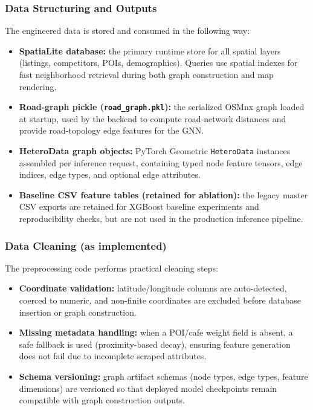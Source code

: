 \subsubsection{Data Structuring and Outputs}
The engineered data is stored and consumed in the following way:

\begin{itemize}
    \item \textbf{SpatiaLite database:} the primary runtime store for all spatial layers (listings, competitors, POIs, demographics). Queries use spatial indexes for fast neighborhood retrieval during both graph construction and map rendering.
    \item \textbf{Road-graph pickle (\texttt{road\_graph.pkl}):} the serialized OSMnx graph loaded at startup, used by the backend to compute road-network distances and provide road-topology edge features for the GNN.
    \item \textbf{HeteroData graph objects:} PyTorch Geometric \texttt{HeteroData} instances assembled per inference request, containing typed node feature tensors, edge indices, edge types, and optional edge attributes.
    \item \textbf{Baseline CSV feature tables (retained for ablation):} the legacy master CSV exports are retained for XGBoost baseline experiments and reproducibility checks, but are not used in the production inference pipeline.
\end{itemize}

\subsubsection{Data Cleaning (as implemented)}
The preprocessing code performs practical cleaning steps:

\begin{itemize}
    \item \textbf{Coordinate validation:} latitude/longitude columns are auto-detected, coerced to numeric, and non-finite coordinates are excluded before database insertion or graph construction.
    \item \textbf{Missing metadata handling:} when a POI/cafe weight field is absent, a safe fallback is used (proximity-based decay), ensuring feature generation does not fail due to incomplete scraped attributes.
    \item \textbf{Schema versioning:} graph artifact schemas (node types, edge types, feature dimensions) are versioned so that deployed model checkpoints remain compatible with graph construction outputs.
\end{itemize}

